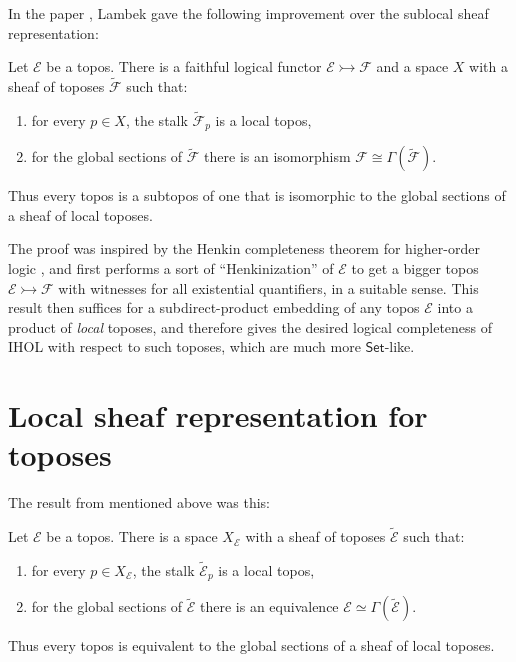 \documentclass[graybox]{svmult}
\newcommand{\EE}{\ensuremath{\mathcal{E}}}
\newcommand{\Set}{\ensuremath{\mathsf{Set}}}
\newcommand{\mono}{\ensuremath{\rightarrowtail}}
\begin{document}
In the paper \cite{L1}, Lambek gave the following improvement over the sublocal sheaf representation:

\begin{theorem}
Let $\EE$ be a topos.  
There is a faithful logical functor $\EE\rightarrowtail\mathcal{F}$ 
and a space $X$ with a sheaf of toposes 
$\widetilde{\mathcal{F}}$ such that:
\begin{enumerate}
\item for every $p\in X$, the stalk $\widetilde{\mathcal{F}}_p$ is a  local topos, 
\item for the global sections of $\widetilde{\mathcal{F}}$ there is an isomorphism $\mathcal{F} \cong \Gamma(\widetilde{\mathcal{F}}) $.
\end{enumerate}
Thus every topos is a  subtopos of one that is isomorphic to the global sections of a sheaf of  local toposes.  
\end{theorem}
\medskip
%
The proof was inspired by the Henkin completeness theorem for higher-order logic \cite{H}, and first performs a sort of ``Henkinization'' of $\EE$ to get a bigger topos $\EE\mono \mathcal{F}$ with witnesses for all existential quantifiers, in a suitable sense. This result then suffices for a subdirect-product embedding of any topos $\EE$ into a product of \emph{local} toposes, and therefore gives the desired logical completeness of IHOL with respect to such toposes, which are much more $\Set$-like.

\section{Local sheaf representation for toposes}\label{section:localtopos}

The result from \cite{A} mentioned above was this:

\begin{theorem}\label{theorem:local}
Let $\EE$ be a topos.  
There is a space $X_\EE$ with a sheaf of toposes $\widetilde{\EE}$ such that:
\begin{enumerate}
\item for every $p\in X_\EE$, the stalk $\widetilde{\EE}_p$ is a local topos, 
\item for the global sections of $\widetilde{\EE}$  there is an equivalence $\EE\simeq \Gamma(\widetilde{\EE})$.
\end{enumerate}
Thus every topos is equivalent to the global sections of a sheaf of local toposes.  
\end{theorem}
\end{document}
